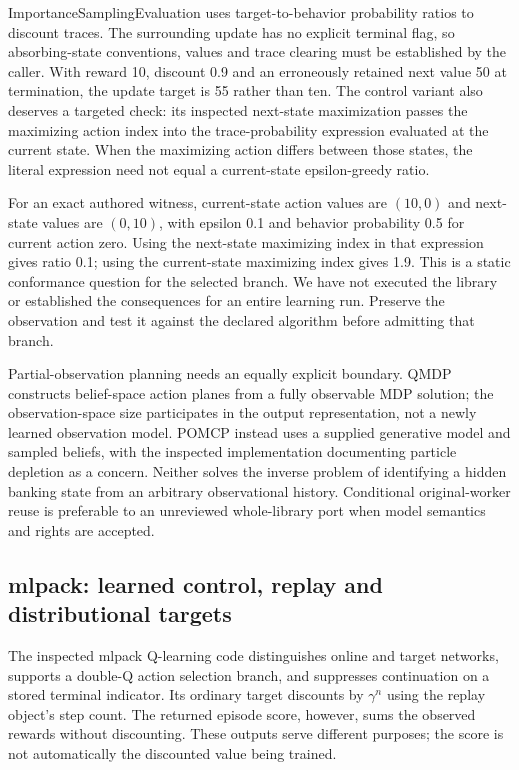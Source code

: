 ImportanceSamplingEvaluation uses target-to-behavior probability ratios to discount traces. The surrounding update has no explicit terminal flag, so absorbing-state conventions, values and trace clearing must be established by the caller. With reward 10, discount 0.9 and an erroneously retained next value 50 at termination, the update target is 55 rather than ten. The control variant also deserves a targeted check: its inspected next-state maximization passes the maximizing action index into the trace-probability expression evaluated at the current state. When the maximizing action differs between those states, the literal expression need not equal a current-state epsilon-greedy ratio.\citep{exec24_policycxx_aitoolbox,exec24_policycxx_comparison}

For an exact authored witness, current-state action values are $(10,0)$ and next-state values are $(0,10)$, with epsilon 0.1 and behavior probability 0.5 for current action zero. Using the next-state maximizing index in that expression gives ratio 0.1; using the current-state maximizing index gives 1.9. This is a static conformance question for the selected branch. We have not executed the library or established the consequences for an entire learning run. Preserve the observation and test it against the declared algorithm before admitting that branch.\citep{exec24_policycxx_aitoolbox,exec24_policycxx_comparison}

Partial-observation planning needs an equally explicit boundary. QMDP constructs belief-space action planes from a fully observable MDP solution; the observation-space size participates in the output representation, not a newly learned observation model. POMCP instead uses a supplied generative model and sampled beliefs, with the inspected implementation documenting particle depletion as a concern. Neither solves the inverse problem of identifying a hidden banking state from an arbitrary observational history. Conditional original-worker reuse is preferable to an unreviewed whole-library port when model semantics and rights are accepted.\citep{exec24_policycxx_aitoolbox,exec24_policycxx_comparison}

\subsection{mlpack: learned control, replay and distributional targets}
The inspected mlpack Q-learning code distinguishes online and target networks, supports a double-Q action selection branch, and suppresses continuation on a stored terminal indicator. Its ordinary target discounts by $\gamma^{n}$ using the replay object's step count. The returned episode score, however, sums the observed rewards without discounting. These outputs serve different purposes; the score is not automatically the discounted value being trained.\citep{exec24_policycxx_mlpack}

